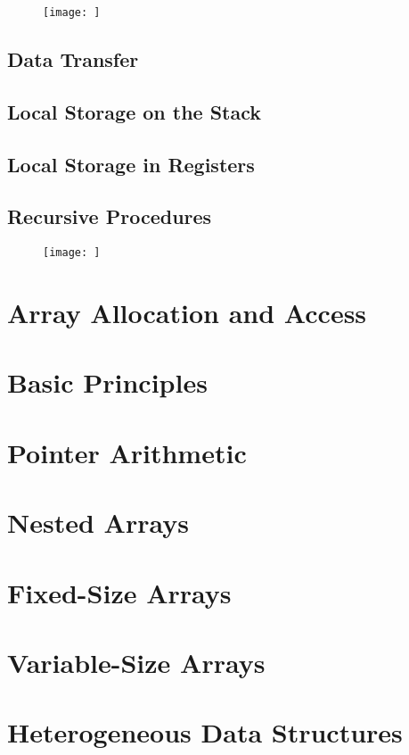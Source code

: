 \begin{figure}[h!]
    \centering
    \texttt{[image: ]}
    \caption{}
\end{figure}


\subsection{Data Transfer}
\subsection{Local Storage on the Stack}
\subsection{Local Storage in Registers}
\subsection{Recursive Procedures}

\begin{figure}[h!]
    \centering
    \texttt{[image: ]}
    \caption{}
\end{figure}


\section{Array Allocation and Access}
\section{Basic Principles}
\section{Pointer Arithmetic}
\section{Nested Arrays}
\section{Fixed-Size Arrays}
\section{Variable-Size Arrays}


\section{Heterogeneous Data Structures}
